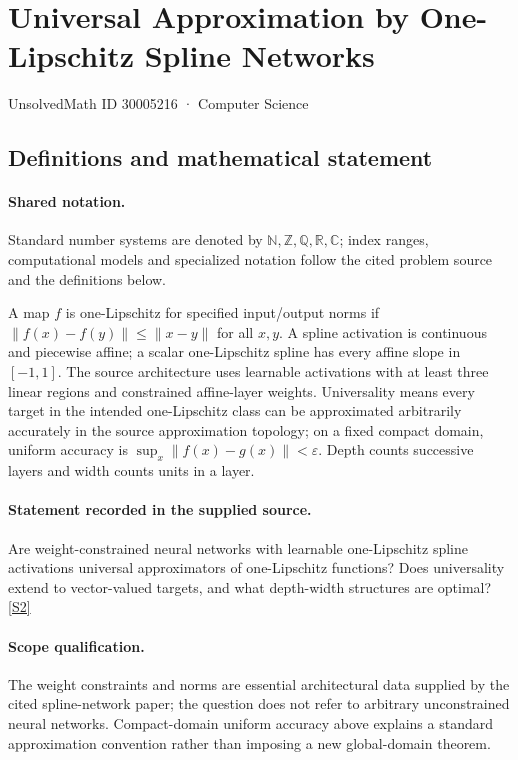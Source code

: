 \documentclass[11pt]{article}
\newcommand{\sref}[2]{\hyperlink{source:#1:#2}{[S#2]}}
\begin{document}
\setcounter{section}{30005215}
\section{Universal Approximation by One-Lipschitz Spline Networks}\label{30005216}
{\small\sffamily UnsolvedMath ID 30005216 · Computer Science}
\subsection{Definitions and mathematical statement}

\paragraph{Shared notation.}Standard number systems are denoted by $\mathbb N,\mathbb Z,\mathbb Q,\mathbb R,\mathbb C$; index ranges, computational models and specialized notation follow the cited problem source and the definitions below.


A map $f$ is one-Lipschitz for specified input/output norms if $\lVert f(x)-f(y)\rVert\leq\lVert x-y\rVert$ for all $x,y$. A spline activation is continuous and piecewise affine; a scalar one-Lipschitz spline has every affine slope in $[-1,1]$. The source architecture uses learnable activations with at least three linear regions and constrained affine-layer weights. Universality means every target in the intended one-Lipschitz class can be approximated arbitrarily accurately in the source approximation topology; on a fixed compact domain, uniform accuracy is $\sup_x\lVert f(x)-g(x)\rVert<\varepsilon$. Depth counts successive layers and width counts units in a layer.
\paragraph{Statement recorded in the supplied source.}
Are weight-constrained neural networks with learnable one-Lipschitz spline activations universal approximators of one-Lipschitz functions? Does universality extend to vector-valued targets, and what depth-width structures are optimal? \sref{30005216}{2}
\paragraph{Scope qualification.}
The weight constraints and norms are essential architectural data supplied by the cited spline-network paper; the question does not refer to arbitrary unconstrained neural networks. Compact-domain uniform accuracy above explains a standard approximation convention rather than imposing a new global-domain theorem.
\end{document}
